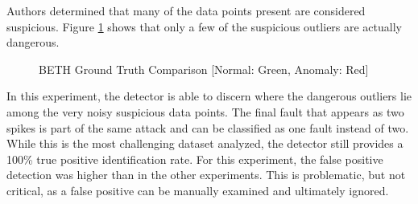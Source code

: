 Authors \cite{beth-dataset} determined that many of the data points present are considered suspicious.
Figure \ref{fig:beth_detection_results} shows that only a few of the suspicious outliers are actually dangerous.

\begin{figure}[H]
    
    \caption{BETH Ground Truth Comparison [Normal: Green, Anomaly: Red]}
    \label{fig:beth_detection_results}
\end{figure}

In this experiment, the detector is able to discern where the dangerous outliers lie among the very noisy suspicious data points.
The final fault that appears as two spikes is part of the same attack and can be classified as one fault instead of two.
While this is the most challenging dataset analyzed, the detector still provides a 100\% true positive identification rate.
For this experiment, the false positive detection was higher than in the other experiments.
This is problematic, but not critical, as a false positive can be manually examined and ultimately ignored.
